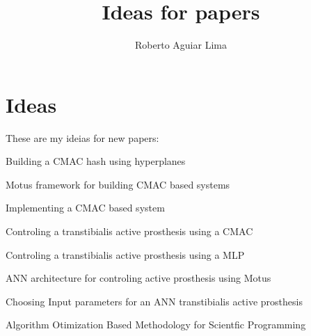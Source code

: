\documentclass{article}
\author{Roberto Aguiar Lima}
\title{Ideas for papers}
\begin{document}
	\maketitle
	\section{Ideas}
		These are my ideias for new papers:

		Building a CMAC hash using hyperplanes 

		Motus framework for building CMAC based systems

		Implementing a CMAC based system

		Controling a transtibialis active prosthesis using a CMAC

		Controling a transtibialis active prosthesis using a MLP

		ANN architecture for controling active prosthesis using Motus

		Choosing Input parameters for an ANN transtibialis active prosthesis

		Algorithm Otimization Based Methodology for Scientfic Programming
\end{document}
